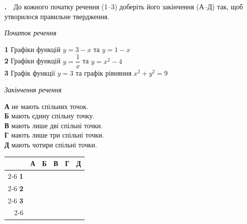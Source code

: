 \documentclass[12pt]{article}
\newcommand{\matchingGrid}{%
    \begingroup
    \renewcommand{\arraystretch}{1.15}
    \setlength{\tabcolsep}{4pt}
    \footnotesize
    \begin{tabular}{r|c|c|c|c|c|}
         \multicolumn{1}{c}{} & \multicolumn{1}{c}{\textbf{А}} & \multicolumn{1}{c}{\textbf{Б}} & \multicolumn{1}{c}{\textbf{В}} & \multicolumn{1}{c}{\textbf{Г}} & \multicolumn{1}{c}{\textbf{Д}} \\ \cline{2-6}
         \textbf{1} & \phantom{X} & \phantom{X} & \phantom{X} & \phantom{X} & \phantom{X} \\ \cline{2-6}
         \textbf{2} & & & & & \\ \cline{2-6}
         \textbf{3} & & & & & \\ \cline{2-6}
    \end{tabular}
    \endgroup
}
\newcounter{zad}
\newcommand{\zadtask}[1]{\stepcounter{zad}\par\vspace{0.3cm}\noindent\textbf{\thezad.}\ \ #1\par\vspace{0.2cm}}
\begin{document}
\zadtask{До кожного початку речення (1--3) доберіть його закінчення (А--Д) так, щоб утворилося правильне твердження.\par
\vspace{0.3cm}
\noindent
\begin{minipage}[t]{0.46\textwidth}
\textit{Початок речення}\par\vspace{0.15cm}
\textbf{1} \quad Графіки функцій $y = 3 - x$ та $y = 1 - x$\\[0.25cm]
\textbf{2} \quad Графіки функцій $y = \dfrac{1}{x}$ та $y = x^2 - 4$\\[0.25cm]
\textbf{3} \quad Графік функції $y = 3$ та графік рівняння $x^2 + y^2 = 9$
\end{minipage}%
\hfill
\begin{minipage}[t]{0.34\textwidth}
\textit{Закінчення речення}\par\vspace{0.15cm}
\textbf{А} \quad не мають спільних точок.\\[0.15cm]
\textbf{Б} \quad мають єдину спільну точку.\\[0.15cm]
\textbf{В} \quad мають лише дві спільні точки.\\[0.15cm]
\textbf{Г} \quad мають лише три спільні точки.\\[0.15cm]
\textbf{Д} \quad мають чотири спільні точки.
\end{minipage}%
\hfill
\begin{minipage}[t]{0.14\textwidth}
\vspace{0.4cm}
\begin{flushright}\matchingGrid\end{flushright}
\end{minipage}}
\end{document}
